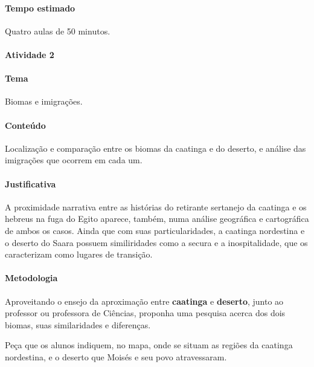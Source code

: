 \documentclass[11pt]{extarticle}
\begin{document}
\paragraph{Tempo estimado} Quatro aulas de 50 minutos.


\paragraph{Atividade 2}

\paragraph{Tema} Biomas e imigrações.

\paragraph{Conteúdo} Localização e comparação entre os biomas
da caatinga e do deserto, e análise das imigrações que ocorrem em cada um. 

\paragraph{Justificativa} A proximidade narrativa entre as histórias do
retirante sertanejo da caatinga e os hebreus na fuga do Egito aparece, também,
numa análise geográfica e cartográfica de ambos os casos. 
Ainda que com suas particularidades, a caatinga nordestina e o deserto do Saara
possuem similiridades como a secura e a inospitalidade, que os caracterizam
como lugares de transição.

\paragraph{Metodologia} 
Aproveitando o ensejo da aproximação entre \textbf{caatinga} e \textbf{deserto}, 
junto ao professor ou professora de Ciências, proponha uma pesquisa acerca dos 
dois biomas, suas similaridades e diferenças.


Peça que os alunos indiquem, no mapa, onde se situam as regiões da 
caatinga nordestina, e o deserto que Moisés e seu povo atravessaram.
\end{document}
